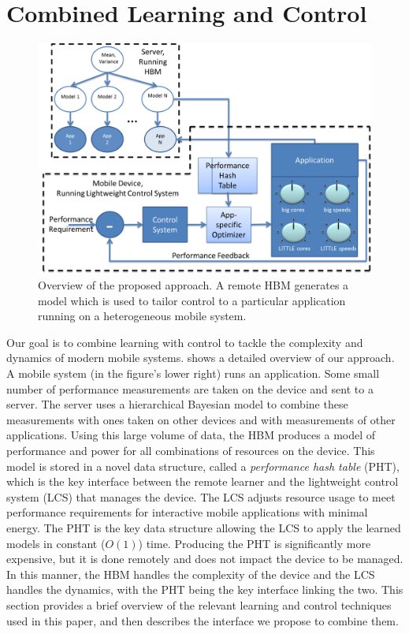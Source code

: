 \section{Combined Learning and Control}
\begin{figure}
\includegraphics[width=\columnwidth]{figures/ControlLearning.png}
\caption{Overview of the proposed approach. A remote HBM generates a
  model which is used to tailor control to a particular application
  running on a heterogeneous mobile system.}
  \label{fig:overview}
\end{figure}


Our goal is to combine learning with control to tackle the complexity
and dynamics of modern mobile systems.   shows a
detailed overview of our approach.  A mobile system (in the figure's
lower right) runs an application.  Some small number of performance
measurements are taken on the device and sent to a server.  The server
uses a hierarchical Bayesian model to combine these measurements with
ones taken on other devices and with measurements of other
applications.  Using this large volume of data, the HBM produces a
model of performance and power for all combinations of resources on
the device.  This model is stored in a novel data structure, called a
\emph{performance hash table} (PHT), which is the key interface
between the remote learner and the lightweight control system (LCS)
that manages the device.  The LCS adjusts resource usage to meet
performance requirements for interactive mobile applications with
minimal energy.  The PHT is the key data structure allowing the LCS to
apply the learned models in constant ($O(1)$) time.  Producing the PHT
is significantly more expensive, but it is done remotely and does not
impact the device to be managed.  In this manner, the HBM handles the
complexity of the device and the LCS handles the dynamics, with the
PHT being the key interface linking the two.  This section provides a
brief overview of the relevant learning and control techniques used in
this paper, and then describes the interface we propose to combine
them.



